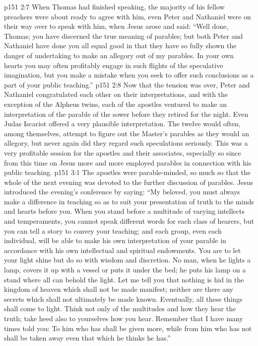 \vs p151 2:7 When Thomas had finished speaking, the majority of his fellow preachers were about ready to agree with him, even Peter and Nathaniel were on their way over to speak with him, when Jesus arose and said: \textcolor{ubdarkred}{“Well done, Thomas; you have discerned the true meaning of parables; but both Peter and Nathaniel have done you all equal good in that they have so fully shown the danger of undertaking to make an allegory out of my parables. In your own hearts you may often profitably engage in such flights of the speculative imagination, but you make a mistake when you seek to offer such conclusions as a part of your public teaching.”}
\vs p151 2:8 Now that the tension was over, Peter and Nathaniel congratulated each other on their interpretations, and with the exception of the Alpheus twins, each of the apostles ventured to make an interpretation of the parable of the sower before they retired for the night. Even Judas Iscariot offered a very plausible interpretation. The twelve would often, among themselves, attempt to figure out the Master’s parables as they would an allegory, but never again did they regard such speculations seriously. This was a very profitable session for the apostles and their associates, especially so since from this time on Jesus more and more employed parables in connection with his public teaching.
\vs p151 3:1 The apostles were parable\hyp{}minded, so much so that the whole of the next evening was devoted to the further discussion of parables. Jesus introduced the evening’s conference by saying: \textcolor{ubdarkred}{“My beloved, you must always make a difference in teaching so as to suit your presentation of truth to the minds and hearts before you. When you stand before a multitude of varying intellects and temperaments, you cannot speak different words for each class of hearers, but you can tell a story to convey your teaching; and each group, even each individual, will be able to make his own interpretation of your parable in accordance with his own intellectual and spiritual endowments. You are to let your light shine but do so with wisdom and discretion. No man, when he lights a lamp, covers it up with a vessel or puts it under the bed; he puts his lamp on a stand where all can behold the light. Let me tell you that nothing is hid in the kingdom of heaven which shall not be made manifest; neither are there any secrets which shall not ultimately be made known. Eventually, all these things shall come to light. Think not only of the multitudes and how they hear the truth; take heed also to yourselves how you hear. Remember that I have many times told you: To him who has shall be given more, while from him who has not shall be taken away even that which he thinks he has.”}
